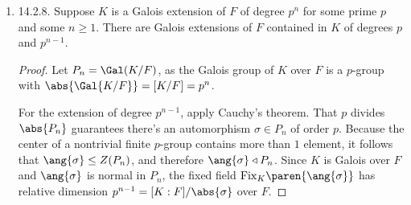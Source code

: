 \documentclass[onesided]{ccg-pset}
\newcommand{\Fp}{\mathbb{F}_p} %
\newcommand{\Fix}[2]{\mathrm{Fix}_{#1}\paren{#2}}
\begin{document}
\begin{enumerate}
\begin{proof}
    Fix a generator $a$ of $\Fp^\times$, and define a group homomorphism $f\colon \Gal(F/\Q) \to H$ by
    \[
        \sigma \underset{f}{\mapsto} \mqty[ a & 0\\ 0 & 1 ] \qand
        \tau \underset{f}{\mapsto} \mqty[ 1 & 1\\ 0 & 1 ]
    .\]
    \begin{claim*}[]
        As defined, $f$ is an isomorphism of groups.
    \end{claim*} 
    Observe $f$ is a bijection of finite sets. Moreover, $f$ is defined on generators $\sigma$ and $\tau$ of $\Gal(F/\Q)$. Lastly, the images of $\sigma$ and $\tau$ under $f$ are generators of $H$ that satisfy relations analogous to \eqref{analogousrelations}:
    \begin{align*}
        \mqty[ 1 & 1\\ 0 & 1 ]^p &= \mqty[ 1 & 0\\ 0 & 1 ],
                 & \mqty[ a & 0\\ 0 & 1 ]^{p-1} &= \mqty[ 1 & 0\\ 0 & 1 ],
                 & \mqty[ a^{-1} & 0\\ 0 & 1 ]\mqty[ 1 & 1\\ 0 & 1 ]\mqty[ a & 0\\ 0 & 1 ] &= \mqty[ 1 & a^{-1} \\0 & 1 ].
    \end{align*}
    Because $\Gal(F/\Q)$ and $H$ have isomorphic presentations, they are isomorphic as groups.
\end{proof}

\item \label{14.2.8} 14.2.8. 
Suppose $K$ is a Galois extension of $F$ of degree $p^n$ for some prime $p$ and some $n \ge 1$. 
There are Galois extensions of $F$ contained in $K$ of degrees $p$ and $p^{n-1}$.

\begin{proof}
    Let $P_n = \Gal(K/F)$, as the Galois group of $K$ over $F$ is a $p$-group with $\abs{\Gal{K/F}} = [K/F] = p^n$.


    For the extension of degree $p^{n-1}$, apply Cauchy's theorem. 
    That $p$ divides $\abs{P_n}$ guarantees there's an automorphism $\sigma \in P_n$ of order $p$. 
    Because the center of a nontrivial finite $p$-group contains more than $1$ element, it follows that $\ang{\sigma} \le Z(P_n)$, and therefore $\ang{\sigma} \triangleleft P_n$. 
    Since $K$ is Galois over $F$ and $\ang{\sigma}$ is normal in $P_n$, the fixed field $\Fix K { \ang{\sigma} }$ has relative dimension $p^{n-1} = [K:F]/\abs{\sigma}$ over $F$. 


\end{proof}
\end{enumerate}
\end{document}
